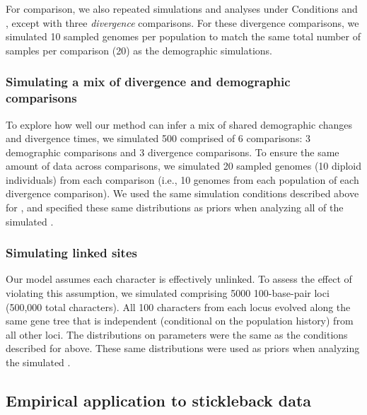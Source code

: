 For comparison, we also repeated simulations and analyses under Conditions
\vsimfourinc and \msimfourinc, except with three \emph{divergence} comparisons.
For these divergence comparisons, we simulated 10 sampled genomes per
population to match the same total number of samples per comparison (20) as the
demographic simulations.


\subsubsection{Simulating a mix of divergence and demographic comparisons}

To explore how well our method can infer a mix of shared demographic changes
and divergence times, we simulated 500 \datasets comprised of 6 comparisons:
3 demographic comparisons and
3 divergence comparisons.
To ensure the same amount of data across comparisons, we simulated
20 sampled genomes (10 diploid individuals) from each comparison
(i.e., 10 genomes from each population of each divergence comparison).
We used the same simulation conditions described above for
\vsimtwoinc,
and specified these same distributions as priors when analyzing all of the
simulated \datasets.


\subsubsection{Simulating linked sites}
Our model assumes each character is effectively unlinked.
To assess the effect of violating this assumption, we simulated \datasets
comprising 5000 100-base-pair loci (500,000 total characters).
All 100 characters from each locus evolved along the same gene tree that is
independent (conditional on the population history) from all other loci.
The distributions on parameters were the same
as the conditions described for \vsimfourinc above.
These same distributions were used as priors when analyzing the simulated
\datasets.



\subsection{Empirical application to stickleback data}


